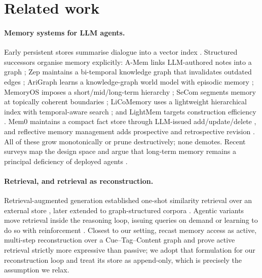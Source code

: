 \documentclass{article}
\theoremstyle{definition}\newtheorem{remark}{Remark}
\theoremstyle{plain}\newtheorem{proposition}{Proposition}
\begin{document}
\section{Related work}

\paragraph{Memory systems for LLM agents.} Early persistent stores summarise
dialogue into a vector index \citep{zhong2024memorybank,langmem2025}.
Structured successors organise memory explicitly: A-Mem links LLM-authored
notes into a graph \citep{xu2025amem}; Zep maintains a bi-temporal knowledge
graph that invalidates outdated edges \citep{rasmussen2025zep}; AriGraph learns
a knowledge-graph world model with episodic memory \citep{anokhin2024arigraph};
MemoryOS imposes a short/mid/long-term hierarchy \citep{kang2025memoryos};
SeCom segments memory at topically coherent boundaries \citep{pan2025secom};
LiCoMemory uses a lightweight hierarchical index with temporal-aware search
\citep{huang2025licomemory}; and LightMem targets construction efficiency
\citep{fang2025lightmem}. Mem0 maintains a compact fact store through
LLM-issued add/update/delete \citep{chhikara2025mem0}, and reflective memory
management adds prospective and retrospective revision
\citep{tan2025reflective}. All of these grow monotonically or prune
destructively; none demotes. Recent surveys map the design space
\citep{hu2025memorysurvey,gao2026selfevolving} and argue that long-term memory
remains a principal deficiency of deployed agents
\citep{hatalis2023memorymatters,hendrycks2025agi}.

\paragraph{Retrieval, and retrieval as reconstruction.} Retrieval-augmented
generation established one-shot similarity retrieval over an external store
\citep{lewis2020rag}, later extended to graph-structured corpora
\citep{han2025graphrag}. Agentic variants move retrieval inside the reasoning
loop, issuing queries on demand \citep{li2025searcho1} or learning to do so
with reinforcement \citep{jin2025searchr1}. Closest to our setting,
\citet{ji2026mragent} recast memory access as active, multi-step
reconstruction over a Cue--Tag--Content graph and prove active retrieval
strictly more expressive than passive; we adopt that formulation for our
reconstruction loop and treat its store as append-only, which is precisely the
assumption we relax.
\end{document}
